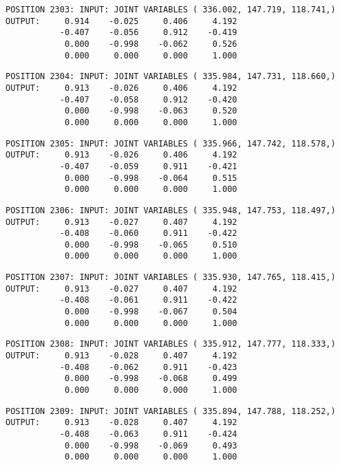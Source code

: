 \begin{verbatim}
POSITION 2303: INPUT: JOINT VARIABLES ( 336.002, 147.719, 118.741,)
OUTPUT:     0.914    -0.025     0.406     4.192
           -0.407    -0.056     0.912    -0.419
            0.000    -0.998    -0.062     0.526
            0.000     0.000     0.000     1.000
\end{verbatim} \pagebreak[1]\begin{verbatim}
POSITION 2304: INPUT: JOINT VARIABLES ( 335.984, 147.731, 118.660,)
OUTPUT:     0.913    -0.026     0.406     4.192
           -0.407    -0.058     0.912    -0.420
            0.000    -0.998    -0.063     0.520
            0.000     0.000     0.000     1.000
\end{verbatim} \pagebreak[1]\begin{verbatim}
POSITION 2305: INPUT: JOINT VARIABLES ( 335.966, 147.742, 118.578,)
OUTPUT:     0.913    -0.026     0.406     4.192
           -0.407    -0.059     0.911    -0.421
            0.000    -0.998    -0.064     0.515
            0.000     0.000     0.000     1.000
\end{verbatim} \pagebreak[1]\begin{verbatim}
POSITION 2306: INPUT: JOINT VARIABLES ( 335.948, 147.753, 118.497,)
OUTPUT:     0.913    -0.027     0.407     4.192
           -0.408    -0.060     0.911    -0.422
            0.000    -0.998    -0.065     0.510
            0.000     0.000     0.000     1.000
\end{verbatim} \pagebreak[1]\begin{verbatim}
POSITION 2307: INPUT: JOINT VARIABLES ( 335.930, 147.765, 118.415,)
OUTPUT:     0.913    -0.027     0.407     4.192
           -0.408    -0.061     0.911    -0.422
            0.000    -0.998    -0.067     0.504
            0.000     0.000     0.000     1.000
\end{verbatim} \pagebreak[1]\begin{verbatim}
POSITION 2308: INPUT: JOINT VARIABLES ( 335.912, 147.777, 118.333,)
OUTPUT:     0.913    -0.028     0.407     4.192
           -0.408    -0.062     0.911    -0.423
            0.000    -0.998    -0.068     0.499
            0.000     0.000     0.000     1.000
\end{verbatim} \pagebreak[1]\begin{verbatim}
POSITION 2309: INPUT: JOINT VARIABLES ( 335.894, 147.788, 118.252,)
OUTPUT:     0.913    -0.028     0.407     4.192
           -0.408    -0.063     0.911    -0.424
            0.000    -0.998    -0.069     0.493
            0.000     0.000     0.000     1.000
\end{verbatim} \pagebreak[1]\begin{verbatim}

\end{verbatim}
